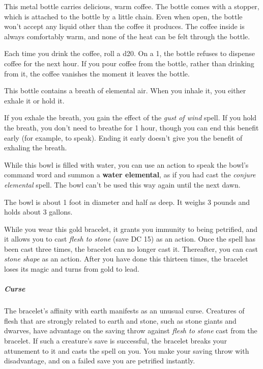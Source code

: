 \documentclass[10pt,a4paper,twoside,bg=print,twocolumn,openany,nodeprecatedcode]{dndbook}
\begin{document}
This metal bottle carries delicious, warm coffee. The bottle comes with a stopper, which is attached to the bottle by a little chain. Even when open, the bottle won't accept any liquid other than the coffee it produces. The coffee inside is always comfortably warm, and none of the heat can be felt through the bottle.

Each time you drink the coffee, roll a d20. On a 1, the bottle refuses to dispense coffee for the next hour. If you pour coffee from the bottle, rather than drinking from it, the coffee vanishes the moment it leaves the bottle.

This bottle contains a breath of elemental air. When you inhale it, you either exhale it or hold it.

If you exhale the breath, you gain the effect of the \textit{gust of wind} spell. If you hold the breath, you don't need to breathe for 1 hour, though you can end this benefit early (for example, to speak). Ending it early doesn't give you the benefit of exhaling the breath.

While this bowl is filled with water, you can use an action to speak the bowl's command word and summon a \textbf{water elemental}, as if you had cast the \textit{conjure elemental} spell. The bowl can't be used this way again until the next dawn.

The bowl is about 1 foot in diameter and half as deep. It weighs 3 pounds and holds about 3 gallons.

While you wear this gold bracelet, it grants you immunity to being petrified, and it allows you to cast \textit{flesh to stone} (save DC 15) as an action. Once the spell has been cast three times, the bracelet can no longer cast it. Thereafter, you can cast \textit{stone shape} as an action. After you have done this thirteen times, the bracelet loses its magic and turns from gold to lead.

\subparagraph{Curse}
The bracelet's affinity with earth manifests as an unusual curse. Creatures of flesh that are strongly related to earth and stone, such as stone giants and dwarves, have advantage on the saving throw against \textit{flesh to stone} cast from the bracelet. If such a creature's save is successful, the bracelet breaks your attunement to it and casts the spell on you. You make your saving throw with disadvantage, and on a failed save you are petrified instantly.
\end{document}
